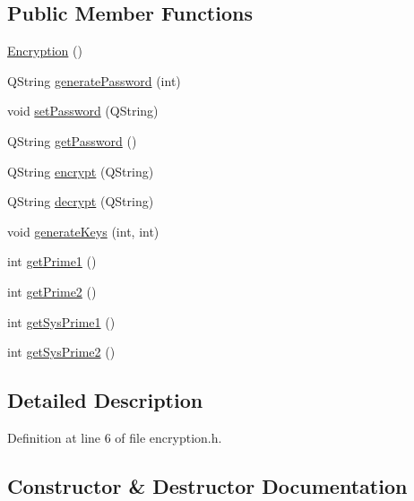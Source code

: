 \subsection*{Public Member Functions}
\begin{DoxyCompactItemize}
\item 
\hyperlink{class_encryption_a705103f49108e659248ba0f9b4af8c00}{Encryption} ()
\item 
Q\+String \hyperlink{class_encryption_a4e2cab5c9d5349f085d40c8373b1985b}{generate\+Password} (int)
\item 
void \hyperlink{class_encryption_a8ddf113b231bf2f60d5714cdf0d07857}{set\+Password} (Q\+String)
\item 
Q\+String \hyperlink{class_encryption_a55e34ee5668779c478f5771d24c2b183}{get\+Password} ()
\item 
Q\+String \hyperlink{class_encryption_a764237662a4daa19502e6454126fa279}{encrypt} (Q\+String)
\item 
Q\+String \hyperlink{class_encryption_aa52a864985f89af118c61a4a3173fd72}{decrypt} (Q\+String)
\item 
void \hyperlink{class_encryption_a737b60a95e826d7a99a3a3f62c9889d2}{generate\+Keys} (int, int)
\item 
int \hyperlink{class_encryption_af133b980f6daf0548a7097623ed35b10}{get\+Prime1} ()
\item 
int \hyperlink{class_encryption_ab4089ae7185f6c10fcea6b6d697872c2}{get\+Prime2} ()
\item 
int \hyperlink{class_encryption_ab182872a04d40023eebb199abfe81896}{get\+Sys\+Prime1} ()
\item 
int \hyperlink{class_encryption_a4a18c3b332487ec393c3ddf06c39c48f}{get\+Sys\+Prime2} ()
\end{DoxyCompactItemize}


\subsection{Detailed Description}


Definition at line 6 of file encryption.\+h.



\subsection{Constructor \& Destructor Documentation}
\hypertarget{class_encryption_a705103f49108e659248ba0f9b4af8c00}{}\label{class_encryption_a705103f49108e659248ba0f9b4af8c00} 
